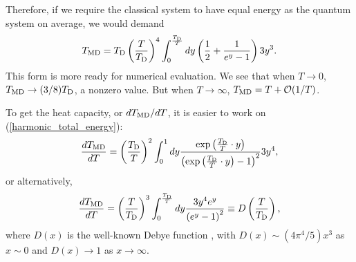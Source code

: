 \documentclass[12pt]{article}
\begin{document}
Therefore, if we require the classical system to have equal energy as
the quantum system on average, we would demand
\begin{equation}
T_{\rm MD} = T_{\rm D} \left ( \frac{T}{T_{\rm D}} \right )^4
\int_0^{\frac{T_{\rm D}}{T}} dy \left ( \frac{1}{2} +
\frac{1}{e^y - 1} \right ) 3y^3.
\label{Debye_temperature_rescaling}
\end{equation}
This form is more ready for numerical evaluation.  We see that when
$T\rightarrow 0$, $T_{\rm MD}\rightarrow (3/8)T_{\rm D}$, a nonzero
value. But when $T\rightarrow \infty$, $T_{\rm MD} = T + {\cal
O}(1/T)$.

To get the heat capacity, or $dT_{\rm MD}/dT$, it is easier to work on
(\ref{harmonic_total_energy}):
\begin{equation}
\frac{dT_{\rm MD}}{dT}
 = \left ( \frac{T_{\rm D}}{T} \right )^2
\int_0^1
dy \frac{
\exp\left ( \frac{T_{\rm D}}{T}\cdot y \right ) }{\left (
\exp\left ( \frac{T_{\rm D}}{T}\cdot y \right ) - 1 \right )^2 }
3y^4,
\end{equation}
or alternatively,
\begin{equation}
\frac{dT_{\rm MD}}{dT}
 = \left ( \frac{T}{T_{\rm D}} \right )^3
\int_0^{\frac{T_{\rm D}}{T}}
dy \frac{3y^4 e^y}{\left (e^y- 1\right )^2} \equiv
D\left( \frac{T}{T_{\rm D}} \right ),
\label{Debye_heat_capacity}
\end{equation}
where $D(x)$ is the well-known Debye function \cite{McQuarrie76}, with
$D(x)\sim (4\pi^4/5)x^3$ as $x\sim 0$ and $D(x)\rightarrow 1$ as
$x\rightarrow \infty$.
\end{document}
